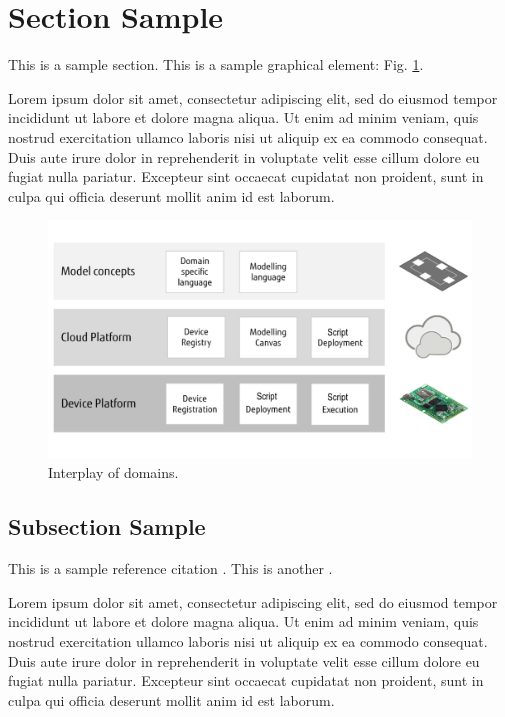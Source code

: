 \section{Section Sample}
\label{sec:blah}

This is a sample section. This is a sample graphical element: Fig. \ref{fig:arch-levels}. 

Lorem ipsum dolor sit amet, consectetur adipiscing elit, sed do eiusmod tempor incididunt ut labore et dolore magna aliqua. Ut enim ad minim veniam, quis nostrud exercitation ullamco laboris nisi ut aliquip ex ea commodo consequat. Duis aute irure dolor in reprehenderit in voluptate velit esse cillum dolore eu fugiat nulla pariatur. Excepteur sint occaecat cupidatat non proident, sunt in culpa qui officia deserunt mollit anim id est laborum.

\begin{figure}[h]
	\centering
	\includegraphics[width=0.8\linewidth]{Figures/architecture-levels}
	\caption[]{Interplay of domains.}
	\label{fig:arch-levels}
\end{figure}

\subsection{Subsection Sample}

This is a sample reference citation \cite{baccelli2018riot}.
This is another \cite{riot:home}.

Lorem ipsum dolor sit amet, consectetur adipiscing elit, sed do eiusmod tempor incididunt ut labore et dolore magna aliqua. Ut enim ad minim veniam, quis nostrud exercitation ullamco laboris nisi ut aliquip ex ea commodo consequat. Duis aute irure dolor in reprehenderit in voluptate velit esse cillum dolore eu fugiat nulla pariatur. Excepteur sint occaecat cupidatat non proident, sunt in culpa qui officia deserunt mollit anim id est laborum.


